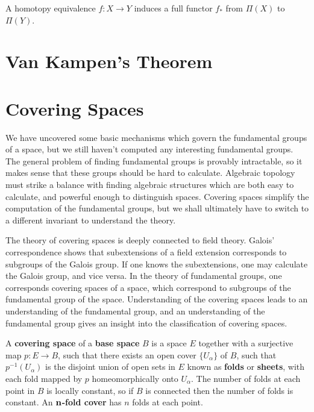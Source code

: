 \begin{corollary}
    A homotopy equivalence $f:X \to Y$ induces a full functor $f_*$ from $\Pi(X)$ to $\Pi(Y)$.
\end{corollary}




\section{Van Kampen's Theorem}




\section{Covering Spaces}

We have uncovered some basic mechanisms which govern the fundamental groups of a space, but we still haven't computed any interesting fundamental groups. The general problem of finding fundamental groups is provably intractable, so it makes sense that these groups should be hard to calculate. Algebraic topology must strike a balance with finding algebraic structures which are both easy to calculate, and powerful enough to distinguish spaces. Covering spaces simplify the computation of the fundamental groups, but we shall ultimately have to switch to a different invariant to understand the theory.

The theory of covering spaces is deeply connected to field theory. Galois' correspondence shows that subextensions of a field extension corresponds to subgroups of the Galois group. If one knows the subextensions, one may calculate the Galois group, and vice versa. In the theory of fundamental groups, one corresponds covering spaces of a space, which correspond to subgroups of the fundamental group of the space. Understanding of the covering spaces leads to an understanding of the fundamental group, and an understanding of the fundamental group gives an insight into the classification of covering spaces.

A {\bf covering space} of a {\bf base space} $B$ is a space $E$ together with a surjective map $p: E \to B$, such that there exists an open cover $\{ U_\alpha \}$ of $B$, such that $p^{-1}(U_\alpha)$ is the disjoint union of open sets in $E$ known as {\bf folds} or {\bf sheets}, with each fold mapped by $p$ homeomorphically onto $U_\alpha$. The number of folds at each point in $B$ is locally constant, so if $B$ is connected then the number of folds is constant. An {\bf $\bf{n}$-fold cover} has $n$ folds at each point.

